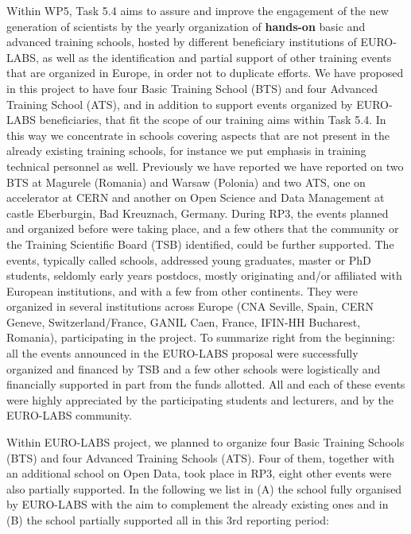 Within WP5, Task 5.4 aims to assure and improve the engagement of the new generation of scientists by the yearly organization of \textbf{hands-on}
basic and advanced training schools, hosted by different beneficiary institutions of EURO-LABS, as well as the identification and partial support of other training events that are organized in Europe, in order not to duplicate efforts. We have proposed  in this project to have four Basic Training School (BTS) and four Advanced Training School (ATS), and in addition to support events organized by EURO-LABS beneficiaries, that fit the scope of our training aims within Task 5.4. In this way we concentrate in schools covering aspects that are not present in the already existing training schools, for instance we put emphasis in training technical personnel as well.  
Previously we have reported we have reported on two BTS at Magurele (Romania) and Warsaw (Polonia)  and two ATS, one on accelerator at CERN and another on Open Science and Data Management at castle Eberburgin, Bad Kreuznach, Germany.
During 
RP3, %
the events planned and organized before were taking place, and a few others that the community or the Training Scientific Board (TSB) identified, could be further supported. The events, typically called schools, addressed young graduates, master or PhD students, seldomly early years postdocs, mostly originating and/or affiliated with European institutions, and with a few from other continents. They were organized in several institutions across Europe (CNA Seville, Spain, CERN Geneve, Switzerland/France, GANIL Caen, France, IFIN-HH Bucharest, Romania), participating in the project. To summarize right from the beginning: all the events announced in the EURO-LABS proposal were successfully organized and financed by TSB and a few other schools were logistically and financially supported in part from the funds allotted. All and each of these events were highly appreciated by the participating students and lecturers, and by the EURO-LABS community.  

Within EURO-LABS project, 
we planned to organize four Basic Training Schools (BTS) and four Advanced Training Schools (ATS). 
Four of them, together with an additional school on Open Data, 
took place in RP3, eight other events were also partially supported. In the following we list in (A) the school fully organised by EURO-LABS with the aim to complement the already existing ones and in (B) the school partially supported all in this 3rd reporting period:

